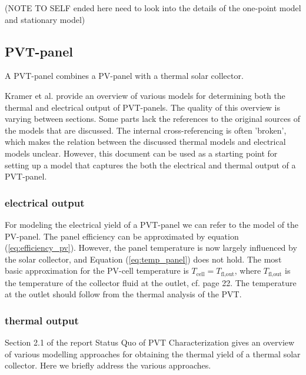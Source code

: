 (NOTE TO SELF ended here need to look into the details of the one-point model and stationary model)





\subsection{PVT-panel}

A PVT-panel combines a PV-panel with a thermal solar collector. 

Kramer et al. \cite{SHC2020PVT} provide an overview of various models for determining both the thermal and electrical output of PVT-panels. The quality of this overview is varying between sections. Some parts lack the references to the original sources of the models that are discussed. The internal cross-referencing is often 'broken', which makes the relation between the discussed thermal models and electrical models unclear. However, this document can be used as a starting point for setting up a model that captures the both the electrical and thermal output of a PVT-panel.

\subsubsection{electrical output}
For modeling the electrical yield of a PVT-panel we can refer to the model of the PV-panel. The panel efficiency can be approximated by equation (\ref{eq:efficiency_pv}). However, the panel temperature is now largely influenced by the solar collector, and Equation (\ref{eq:temp_panel}) does not hold. The most basic approximation for the PV-cell temperature is $T_{\text{cell}} = T_{\text{fl,out}}$, where $T_{\text{fl,out}} $ is the temperature of the collector fluid at the outlet, cf. \cite{SHC2020PVT} page 22. The temperature at the outlet should follow from the thermal analysis of the PVT.

\subsubsection{thermal output}
Section 2.1 of the report Status Quo of PVT Characterization \cite{SHC2020PVT} gives an overview of various modelling approaches for obtaining the thermal yield of a thermal solar collector.
Here we briefly address the various approaches.

